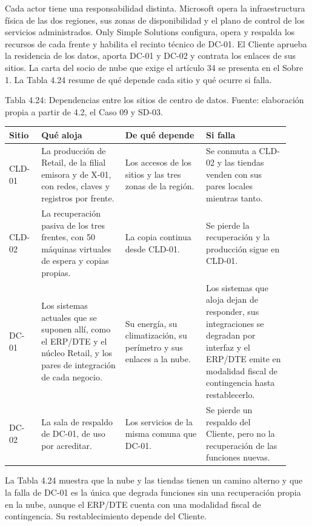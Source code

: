 \documentclass[11pt]{article}
\begin{document}
Cada actor tiene una responsabilidad distinta. Microsoft opera la infraestructura física de las dos regiones, sus zonas de disponibilidad y el plano de control de los servicios administrados. Only Simple Solutions configura, opera y respalda los recursos de cada frente y habilita el recinto técnico de DC-01. El Cliente aprueba la residencia de los datos, aporta DC-01 y DC-02 y contrata los enlaces de sus sitios. La carta del socio de nube que exige el artículo 34 se presenta en el Sobre 1. La Tabla 4.24 resume de qué depende cada sitio y qué ocurre si falla.

\par\vspace{0pt plus 10\baselineskip}\vspace{0pt plus -10\baselineskip}

Tabla 4.24: Dependencias entre los sitios de centro de datos. Fuente: elaboración propia a partir de 4.2, el Caso 09 y SD-03.\par\nopagebreak
\begin{longtable}{@{}p{0.106\linewidth}p{0.279\linewidth}p{0.26\linewidth}p{0.279\linewidth}@{}}
\toprule Sitio & Qué aloja & De qué depende & Si falla \\
\midrule\endhead\bottomrule\endlastfoot
CLD-01 & La producción de Retail, de la filial emisora y de X-01, con redes, claves y registros por frente. & Los accesos de los sitios y las tres zonas de la región. & Se conmuta a CLD-02 y las tiendas venden con sus pares locales mientras tanto. \\
CLD-02 & La recuperación pasiva de los tres frentes, con 50 máquinas virtuales de espera y copias propias. & La copia continua desde CLD-01. & Se pierde la recuperación y la producción sigue en CLD-01. \\
DC-01 & Los sistemas actuales que se suponen allí, como el ERP/DTE y el núcleo Retail, y los pares de integración de cada negocio. & Su energía, su climatización, su perímetro y sus enlaces a la nube. & Los sistemas que aloja dejan de responder, sus integraciones se degradan por interfaz y el ERP/DTE emite en modalidad fiscal de contingencia hasta restablecerlo. \\
DC-02 & La sala de respaldo de DC-01, de uso por acreditar. & Los servicios de la misma comuna que DC-01. & Se pierde un respaldo del Cliente, pero no la recuperación de las funciones nuevas. \\
\end{longtable}

La Tabla 4.24 muestra que la nube y las tiendas tienen un camino alterno y que la falla de DC-01 es la única que degrada funciones sin una recuperación propia en la nube, aunque el ERP/DTE cuenta con una modalidad fiscal de contingencia. Su restablecimiento depende del Cliente.
\end{document}
